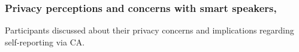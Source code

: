         
        
           

        
    
    
\subsubsection{Privacy perceptions and concerns with smart speakers,}
    Participants discussed about their privacy concerns and implications regarding self-reporting via \ac{CA}.

